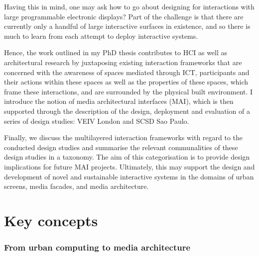 Having this in mind, one may ask how to go about designing for interactions
with large programmable electronic displays? Part of the challenge is that there
are currently only a handful of large interactive surfaces in existence, and so there
is much to learn from each attempt to deploy interactive systems. 

Hence, the work outlined in my PhD thesis contributes to HCI as well as architectural research by juxtaposing
existing interaction frameworks that are concerned with the awareness of
spaces mediated through ICT, participants and their actions within these spaces as well as the properties of these spaces, which frame these interactions, and are surrounded by the physical built environment. I introduce the notion of media
architectural interfaces (MAI), which is then supported through the description of
the design, deployment and evaluation of a series of design studies: 
VEIV London and
SCSD Sao Paulo. 

Finally, we discuss the multilayered interaction frameworks with regard to the conducted design studies and summarise the relevant communalities of these design studies in a taxonomy. The aim of this categorisation is
to provide design implications for future MAI projects. Ultimately, this may support
the design and development of novel and sustainable interactive systems in
the domains of urban screens, media facades, and media architecture.


 
\section{Key concepts}

\subsubsection* {From urban computing to media architecture}

